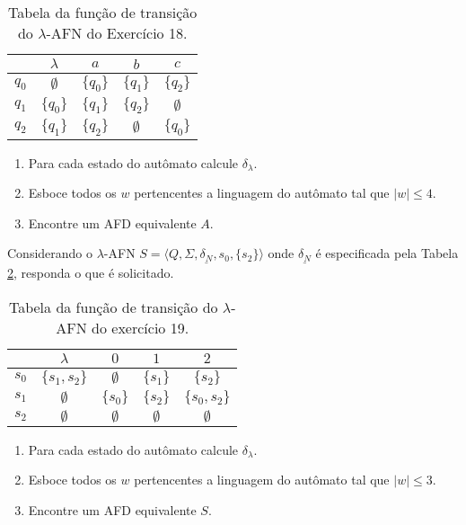 \begin{problemset}
	\begin{table}[h]
		\centering
		\begin{tabular}{c|cccc}
			\backslashbox{$Q'$}{$\Sigma$}	& $\lambda$ & $a$ & $b$ & $c$\\\hline
			$q_0$ & $\emptyset$ & $\{q_0\}$ & $\{q_1\}$ & $\{q_2\}$\\
			$q_1$ & $\{q_0\}$ & $\{q_1\}$ & $\{q_2\}$ & $\emptyset$\\
			$q_2$ & $\{q_1\}$ & $\{q_2\}$ & $\emptyset$ & $\{q_0\}$ 		
		\end{tabular}
		\caption{Tabela da função de transição do $\lambda$-AFN do Exercício 18.}
		\label{tab:DeltaLAFN-Exe25}
	\end{table}

	\begin{enumerate}
		\item Para cada estado do autômato calcule $\delta_\lambda$.
		\item Esboce todos os $w$ pertencentes a linguagem do autômato tal que $|w| \leq 4$.
		\item Encontre um AFD equivalente $A$. 
	\end{enumerate}

	\item Considerando o $\lambda$-AFN $S = \langle Q, \Sigma, \underline{\delta_N}, s_0, \{s_2\} \rangle$ onde $\underline{\delta_N}$ é especificada pela Tabela \ref{tab:DeltaLAFN-Exe26}, responda o que é solicitado.
	
	\begin{table}[h]
		\centering
		\begin{tabular}{c|cccc}
			\backslashbox{$Q'$}{$\Sigma$}	& $\lambda$ & $0$ & $1$ & $2$\\\hline
			$s_0$ & $\{s_1, s_2\}$ & $\emptyset$  & $\{s_1\}$ & $\{s_2\}$\\
			$s_1$ & $\emptyset$ & $\{s_0\}$ & $\{s_2\}$ & $\{s_0, s_2\}$ \\
			$s_2$ & $\emptyset$ & $\emptyset$ & $\emptyset$ & $\emptyset$ 		
		\end{tabular}
		\caption{Tabela da função de transição do $\lambda$-AFN do exercício 19.}
		\label{tab:DeltaLAFN-Exe26}
	\end{table}

	\begin{enumerate}
		\item Para cada estado do autômato calcule $\delta_\lambda$.
		\item Esboce todos os $w$ pertencentes a linguagem do autômato tal que $|w| \leq 3$.
		\item Encontre um AFD equivalente $S$. 
	\end{enumerate}


\end{problemset}
